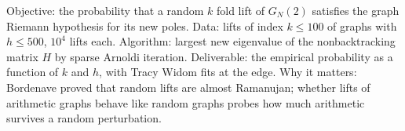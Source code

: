 \begin{compproblem}
Objective: the probability that a random $k$ fold lift of $G_N(2)$ satisfies the graph Riemann hypothesis for its new poles. Data: lifts of index $k\le100$ of graphs with $h\le500$, $10^4$ lifts each. Algorithm: largest new eigenvalue of the nonbacktracking matrix $H$ by sparse Arnoldi iteration. Deliverable: the empirical probability as a function of $k$ and $h$, with Tracy Widom fits at the edge. Why it matters: Bordenave proved that random lifts are almost Ramanujan; whether lifts of arithmetic graphs behave like random graphs probes how much arithmetic survives a random perturbation.
\end{compproblem}
